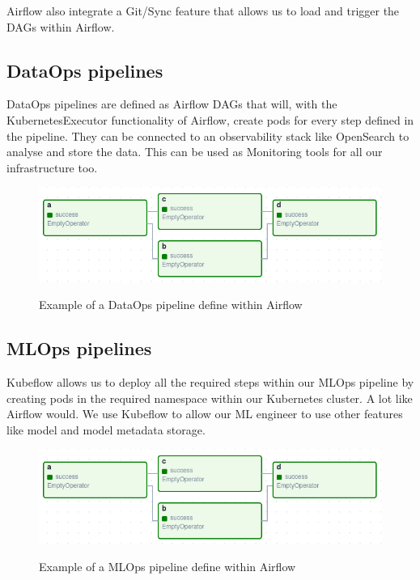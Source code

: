 Airflow also integrate a Git/Sync feature that allows us to load and trigger the DAGs within Airflow.

\subsection{DataOps pipelines}
DataOps pipelines are defined as Airflow DAGs that will, with the KubernetesExecutor functionality of Airflow,
create pods for every step defined in the pipeline.
They can be connected to an observability stack like OpenSearch to analyse and store the data.
This can be used as Monitoring tools for all our infrastructure too.

\begin{figure}[!htbp]
    \centering
    \caption{Example of a DataOps pipeline define within Airflow}
    \includegraphics[scale=0.5]{images/project/data-ops-airflow-dag}
    \label{fig:project-data-ops-airflow-dag}
\end{figure}

\subsection{MLOps pipelines}
Kubeflow allows us to deploy all the required steps within our MLOps pipeline by creating pods in the required namespace within our Kubernetes cluster.
A lot like Airflow would.
We use Kubeflow to allow our ML engineer to use other features like model and model metadata storage.

\begin{figure}[!htbp]
    \centering
    \caption{Example of a MLOps pipeline define within Airflow}
    \includegraphics[scale=0.5]{images/project/data-ops-airflow-dag}
    \label{fig:project-ml-ops-airflow-dag}
\end{figure}

